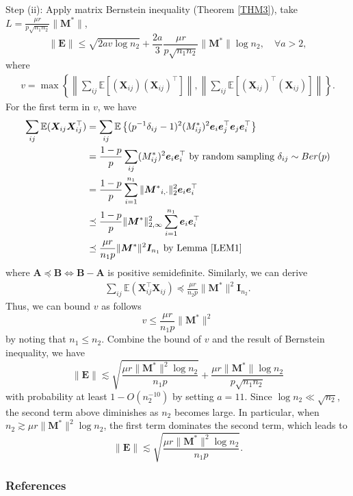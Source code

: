 \documentclass[override]{beamer} %
\theoremstyle{remark}
\newcommand{\bs}[1]{{\boldsymbol{#1}^*}}
\newcommand{\bb}[1]{{\boldsymbol {#1}}}
\begin{document}
\begin{frame}
\item Step (ii): 
Apply matrix Bernstein inequality (Theorem \ref{THM3}), take $L =  \frac{\mu r}{p\sqrt{n_1 n_2}}\|\bs M\|$,
\[
\|\bb E\|\leq \sqrt{2av\log n_2} + \frac{2a}{3} \frac{\mu r}{p\sqrt{n_1 n_2}}\|\bs M\| \log n_2, \quad \forall a>2,
\]
where 
\begin{align*}
v = 
\max \left\{ \left\|\sum_{ij} \mathbb{E}\left[\left(\bb X_{ij}\right)\left(\bb X_{ij}\right)^{\top}\right] \right\|,
\left\|\sum_{ij} \mathbb{E}\left[\left(\bb X_{ij}\right)^{\top}\left(\bb X_{ij}\right)\right]\right\|\right\}.
\end{align*}
For the first term in $v$,  we have
\begin{align*}
\sum_{ij}\mathbb E(\bb X_{ij} \bb X_{ij}^\top) 
& = \sum_{ij} \mathbb E \left\{ (p^{-1} \delta_{ij}-1)^2 (M_{ij}^*)^2 \bb e_i \bb e_j ^\top \bb e_j \bb e_i^\top \right\}\\
& = \frac{1-p}{p}\sum_{ij} (M_{ij}^*)^2 \bb e_i \bb e_i^\top \text{ by random sampling } \delta_{ij}\sim Ber(p)\\
& = \frac{1-p}{p}\sum_{i=1}^{n_1} \|\bs M_{i,\cdot}\|_2^2 \bb e_i \bb e_i^\top\\
&\preceq \frac{1-p}{p} \|\bs M\|_{2,\infty}^2 \sum_{i=1}^{n_1}\bb e_i \bb e_i^\top \\
& \preceq \frac{\mu r}{ n_1 p }\|\bs M\|^2 \bb I_{n_1} \text{ by Lemma \ref{LEM1}}
\end{align*}
where $\bb A\preceq\bb B \iff \bb B - \bb A$ is positive semidefinite.  
Similarly, we can derive 
\begin{align*}
\sum_{ij}\mathbb E(\bb X_{ij}^\top \bb X_{ij})  \preceq \frac{\mu r}{ n_2 p }\|\bs M\|^2 \bb I_{n_2}.
\end{align*}
Thus, we can bound $v$ as follows
$$
v\leq \frac{\mu r}{n_1 p} \|\bs M\|^2
$$
by noting that $n_1\leq n_2$.
Combine the bound of $v$ and the result of Bernstein inequality, we have 
$$
\|\bb E\|\lesssim \sqrt{\frac{\mu r \|\bs M\|^2\log n_2 }{n_1 p}} + \frac{\mu r \|\bs M\| \log n_2}{ p\sqrt{n_1 n_2}}
$$
with probability at least $1-O(n_2^{-10})$ by setting $a = 11$.
Since $\log n_2 \ll \sqrt{n_2}$, the second term above diminishes as $n_2$ becomes large. 
In particular, when $n_2 \gtrsim\mu r \|\bs M\|^2 \log n_2$, the first term dominates the second term, which leads to 
$$
\|\bb E\|\lesssim \sqrt{\frac{\mu r \|\bs M\|^2\log n_2}{n_1 p}}.
$$
\ei
\end{frame}



\begin{frame}
\frametitle{References}


\end{frame}
\end{document}
